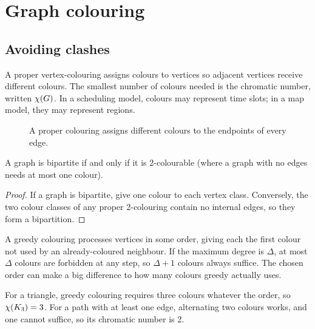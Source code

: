 \chapter{Graph colouring}
\section*{Avoiding clashes}
A proper vertex-colouring assigns colours to vertices so adjacent vertices receive different colours. The smallest number of colours needed is the chromatic number, written $\chi(G)$. In a scheduling model, colours may represent time slots; in a map model, they may represent regions.

\begin{figure}[htbp]
\centering
{}
\caption{A proper colouring assigns different colours to the endpoints of every edge.}
\end{figure}

\begin{theorem}
A graph is bipartite if and only if it is 2-colourable (where a graph with no edges needs at most one colour).
\end{theorem}
\begin{proof}
If a graph is bipartite, give one colour to each vertex class. Conversely, the two colour classes of any proper 2-colouring contain no internal edges, so they form a bipartition.
\end{proof}

A greedy colouring processes vertices in some order, giving each the first colour not used by an already-coloured neighbour. If the maximum degree is $\Delta$, at most $\Delta$ colours are forbidden at any step, so $\Delta+1$ colours always suffice. The chosen order can make a big difference to how many colours greedy actually uses.

\begin{example}
For a triangle, greedy colouring requires three colours whatever the order, so $\chi(K_3)=3$. For a path with at least one edge, alternating two colours works, and one cannot suffice, so its chromatic number is 2.
\end{example}

